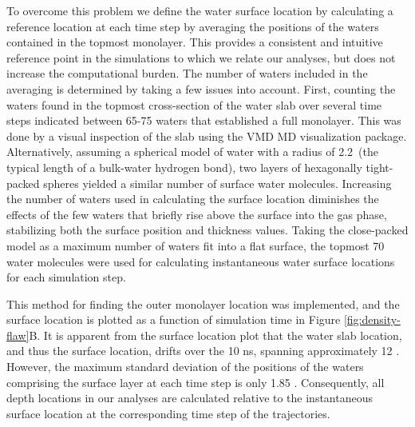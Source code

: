 \documentclass{article}
\begin{document}
	To overcome this problem we define the water surface location by calculating a reference location at each time step by averaging the positions of the waters contained in the topmost monolayer. This provides a consistent and intuitive reference point in the simulations to which we relate our analyses, but does not increase the computational burden. The number of waters included in the averaging is determined by taking a few issues into account. First, counting the waters found in the topmost cross-section of the water slab over several time steps indicated between 65-75 waters that established a full monolayer. This was done by a visual inspection of the slab using the VMD MD visualization package.\cite{Humphrey1996} Alternatively, assuming a spherical model of water with a radius of 2.2\angs~(the typical length of a bulk-water hydrogen bond), two layers of hexagonally tight-packed spheres yielded a similar number of surface water molecules. Increasing the number of waters used in calculating the surface location diminishes the effects of the few waters that briefly rise above the surface into the gas phase, stabilizing both the surface position and thickness values. Taking the close-packed model as a maximum number of waters fit into a flat surface, the topmost 70 water molecules were used for calculating instantaneous water surface locations for each simulation step. 
  
This method for finding the outer monolayer location was implemented, and the surface location is plotted as a function of simulation time in Figure \ref{fig:density-flaw}B. It is apparent from the surface location plot that the water slab location, and thus the surface location, drifts over the 10 ns, spanning approximately 12 \angs. However, the maximum standard deviation of the positions of the waters comprising the surface layer at each time step is only 1.85 \angs. Consequently, all depth locations in our analyses are calculated relative to the instantaneous surface location at the corresponding time step of the trajectories.
\end{document}
